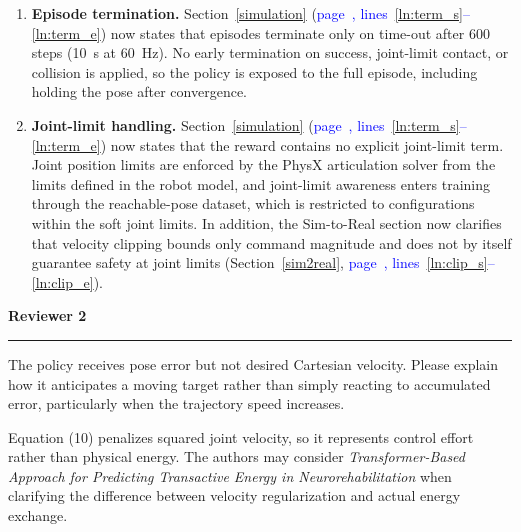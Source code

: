 \documentclass[11pt]{elsarticle}
\newcommand{\reviewerheading}[1]{%
  \par\vspace{0.6em}%
  \phantomsection\pdfbookmark[2]{#1}{#1}%
  {\large\bfseries\color{commentframe}#1}\\[-0.6em]
  {\color{commentframe!40}\rule{\linewidth}{0.6pt}}\par}
\newcommand{\mlines}[2]{\textcolor{blue}{page~\pageref{#1}, lines~\ref{#1}--\ref{#2}}}
\begin{document}
\begin{responsebox}
\begin{enumerate}
  \item \textbf{Episode termination.} Section~\ref{simulation} (\mlines{ln:term_s}{ln:term_e}) now states that episodes terminate only on time-out after 600 steps (10~s at 60~Hz). No early termination on success, joint-limit contact, or collision is applied, so the policy is exposed to the full episode, including holding the pose after convergence.

  \item \textbf{Joint-limit handling.} Section~\ref{simulation} (\mlines{ln:term_s}{ln:term_e}) now states that the reward contains no explicit joint-limit term. Joint position limits are enforced by the PhysX articulation solver from the limits defined in the robot model, and joint-limit awareness enters training through the reachable-pose dataset, which is restricted to configurations within the soft joint limits. In addition, the Sim-to-Real section now clarifies that velocity clipping bounds only command magnitude and does not by itself guarantee safety at joint limits (Section~\ref{sim2real}, \mlines{ln:clip_s}{ln:clip_e}).
\end{enumerate}
\end{responsebox}

\newpage
\reviewerheading{Reviewer 2}

\begin{reviewerbox}
The policy receives pose error but not desired Cartesian velocity. Please explain how it anticipates a moving target rather than simply reacting to accumulated error, particularly when the trajectory speed increases.

Equation (10) penalizes squared joint velocity, so it represents control effort rather than physical energy. The authors may consider \emph{Transformer-Based Approach for Predicting Transactive Energy in Neurorehabilitation} when clarifying the difference between velocity regularization and actual energy exchange.
\end{reviewerbox}
\end{document}
